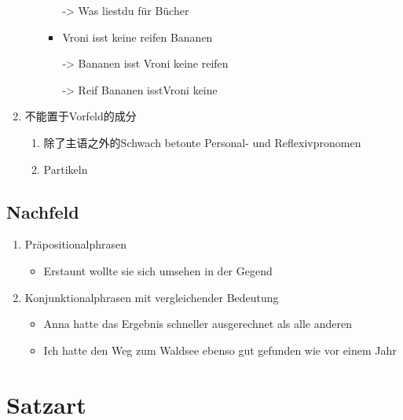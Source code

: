 \documentclass[UTF8]{report}
\begin{document}
\begin{enumerate}
\begin{enumerate}
\begin{itemize}
            -> Was liestdu für Bücher
            \item Vroni isst keine reifen Bananen
            
            -> Bananen isst Vroni keine reifen

            -> Reif Bananen isstVroni keine
        \end{itemize}
    \end{enumerate}
    \item 不能置于Vorfeld的成分
    \begin{enumerate}
        \item 除了主语之外的Schwach betonte Personal- und Reflexivpronomen
        \item Partikeln
    \end{enumerate}
\end{enumerate}

\subsection{Nachfeld}
\begin{enumerate}
    \item Präpositionalphrasen
    \begin{itemize}
        \item Erstaunt wollte sie sich umsehen in der Gegend
    \end{itemize}
    \item Konjunktionalphrasen mit vergleichender Bedeutung
    \begin{itemize}
        \item Anna hatte das Ergebnis schneller ausgerechnet als alle anderen
        \item Ich hatte den Weg zum Waldsee ebenso gut gefunden wie vor einem Jahr
    \end{itemize}
\end{enumerate}


\section{Satzart}
\end{document}
